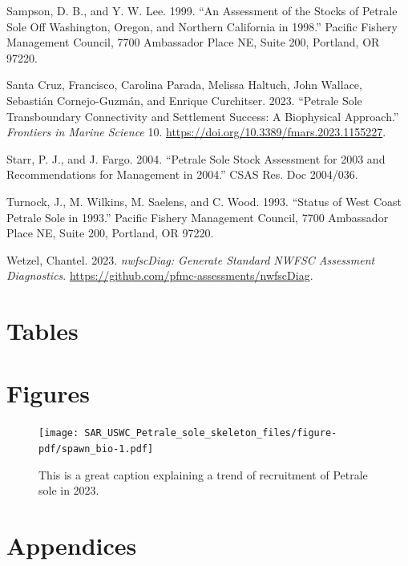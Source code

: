 \documentclass[
]{scrartcl}
\newlength{\cslhangindent}
\newenvironment{CSLReferences}[2] %
 {\begin{list}{}{%
  \setlength{\itemindent}{0pt}
  \setlength{\leftmargin}{0pt}
  \setlength{\parsep}{0pt}
  \ifodd #1
   \setlength{\leftmargin}{\cslhangindent}
   \setlength{\itemindent}{-1\cslhangindent}
  \fi
  \setlength{\itemsep}{#2\baselineskip}}}
 {\end{list}}
\begin{document}
\begin{CSLReferences}{1}{0}
Sampson, D. B., and Y. W. Lee. 1999. {``An Assessment of the Stocks of
Petrale Sole Off {Washington}, {Oregon}, and {Northern} {California} in
1998.''} Pacific Fishery Management Council, 7700 Ambassador Place NE,
Suite 200, Portland, OR 97220.

Santa Cruz, Francisco, Carolina Parada, Melissa Haltuch, John Wallace,
Sebastián Cornejo-Guzmán, and Enrique Curchitser. 2023. {``Petrale Sole
Transboundary Connectivity and Settlement Success: A Biophysical
Approach.''} \emph{Frontiers in Marine Science} 10.
\url{https://doi.org/10.3389/fmars.2023.1155227}.

Starr, P. J., and J. Fargo. 2004. {``Petrale Sole Stock Assessment for
2003 and Recommendations for Management in 2004.''} CSAS Res. Doc
2004/036.

Turnock, J., M. Wilkins, M. Saelens, and C. Wood. 1993. {``Status of
{West} {Coast} Petrale Sole in 1993.''} Pacific Fishery Management
Council, 7700 Ambassador Place NE, Suite 200, Portland, OR 97220.

Wetzel, Chantel. 2023. \emph{nwfscDiag: Generate Standard NWFSC
Assessment Diagnostics}.
\url{https://github.com/pfmc-assessments/nwfscDiag}.

\end{CSLReferences}

\newpage{}

\section{Tables}\label{tables}

\newpage{}

\section{Figures}\label{figures}

\begin{figure}[H]

{\centering \texttt{[image: SAR\_USWC\_Petrale\_sole\_skeleton\_files/figure-pdf/spawn\_bio-1.pdf]}

}

\caption{This is a great caption explaining a trend of recruitment of
Petrale sole in 2023.}

\end{figure}%

\newpage{}

\section{Appendices}\label{appendices}
\end{document}
